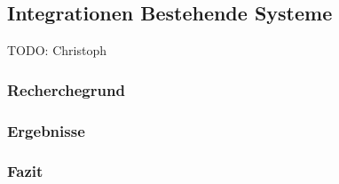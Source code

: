\subsection{Integrationen Bestehende Systeme}

TODO: Christoph

\subsubsection{Recherchegrund}


\subsubsection{Ergebnisse}



\subsubsection{Fazit}

\clearpage 





